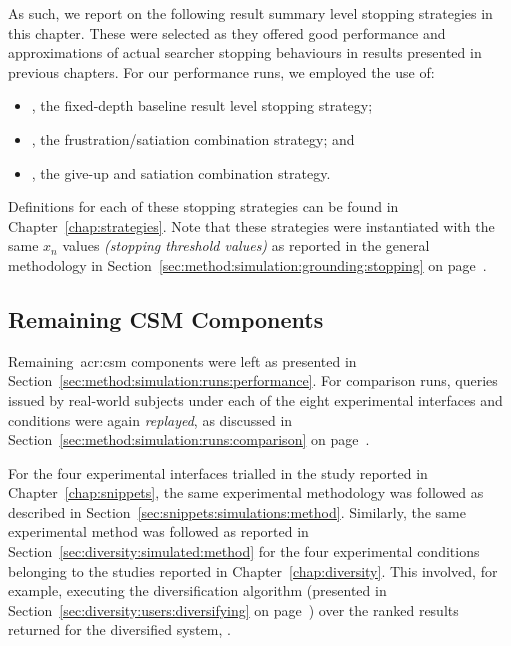 As such, we report on the following result summary level stopping strategies in this chapter. These were selected as they offered good performance and approximations of actual searcher stopping behaviours in results presented in previous chapters. For our performance runs, we employed the use of:

\begin{itemize}
    \item{, the fixed-depth baseline result level stopping strategy;}
    \item{, the frustration/satiation combination strategy; and}
    \item{, the give-up and satiation combination strategy.}
\end{itemize}

Definitions for each of these stopping strategies can be found in Chapter~\ref{chap:strategies}. Note that these strategies were instantiated with the same $x_n$ values \emph{(stopping threshold values)} as reported in the general methodology in Section~\ref{sec:method:simulation:grounding:stopping} on page~\pageref{sec:method:simulation:grounding:stopping}.

\subsection{Remaining CSM Components}\label{sec:serp:method:other}
Remaining~\gls{acr:csm} components were left as presented in Section~\ref{sec:method:simulation:runs:performance}. For comparison runs, queries issued by real-world subjects under each of the eight experimental interfaces and conditions were again \emph{replayed}, as discussed in Section~\ref{sec:method:simulation:runs:comparison} on page~\pageref{sec:method:simulation:runs:comparison}.

For the four experimental interfaces trialled in the study reported in Chapter~\ref{chap:snippets}, the same experimental methodology was followed as described in Section~\ref{sec:snippets:simulations:method}. Similarly, the same experimental method was followed as reported in Section~\ref{sec:diversity:simulated:method} for the four experimental conditions belonging to the studies reported in Chapter~\ref{chap:diversity}. This involved, for example, executing the diversification algorithm (presented in Section~\ref{sec:diversity:users:diversifying} on page~\pageref{sec:diversity:users:diversifying}) over the ranked results returned for the diversified system, .

